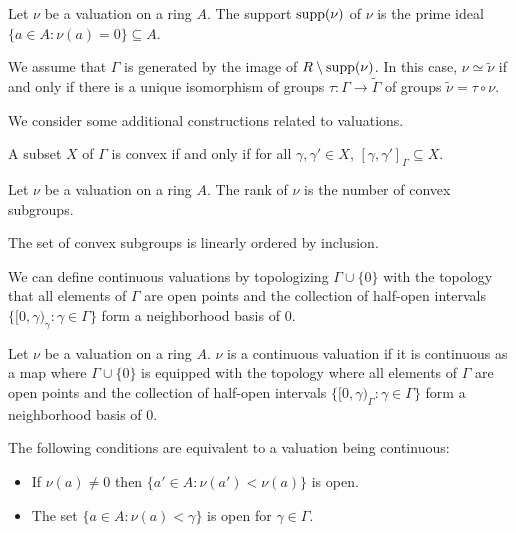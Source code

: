 \begin{definition}\label{def: support of valuation}
    Let $\nu$ be a valuation on a ring $A$. The support $\mathrm{supp}(\nu)$ of $\nu$ is the prime ideal $\{a\in A:\nu(a)=0\}\subseteq A$. 
\end{definition}
\begin{remark}\label{rmk: equivalence relation on valuations}
    We assume that $\Gamma$ is generated by the image of $R\setminus\mathrm{supp}(\nu)$. In this case, $\nu\simeq\widetilde{\nu}$ if and only if there is a unique isomorphism of groups $\tau:\Gamma\to\widetilde{\Gamma}$ of groups $\widetilde{\nu}=\tau\circ\nu$. 
\end{remark}
We consider some additional constructions related to valuations. 
\begin{definition}\label{def: convex subset}
    A subset $X$ of $\Gamma$ is convex if and only if for all $\gamma,\gamma'\in X$, $[\gamma,\gamma']_{\Gamma}\subseteq X$. 
\end{definition}
\begin{definition}\label{def: rank of valuation}
    Let $\nu$ be a valuation on a ring $A$. The rank of $\nu$ is the number of convex subgroups. 
\end{definition}
\begin{remark}
    The set of convex subgroups is linearly ordered by inclusion. 
\end{remark}
We can define continuous valuations by topologizing $\Gamma\cup\{0\}$ with the topology that all elements of $\Gamma$ are open points and the collection of half-open intervals $\{[0,\gamma)_{\gamma}:\gamma\in\Gamma\}$ form a neighborhood basis of 0. 
\begin{definition}\label{def: continuous valuation}
    Let $\nu$ be a valuation on a ring $A$. $\nu$ is a continuous valuation if it is continuous as a map where $\Gamma\cup\{0\}$ is equipped with the topology where all elements of $\Gamma$ are open points and the collection of half-open intervals $\{[0,\gamma)_{\Gamma}:\gamma\in\Gamma\}$ form a neighborhood basis of 0.
\end{definition}
\begin{remark}
    The following conditions are equivalent to a valuation being continuous: 
    \begin{itemize}
        \item If $\nu(a)\neq0$ then $\{a'\in A:\nu(a')<\nu(a)\}$ is open. 
        \item The set $\{a\in A:\nu(a)<\gamma\}$ is open for $\gamma\in\Gamma$. 
    \end{itemize}
\end{remark}
